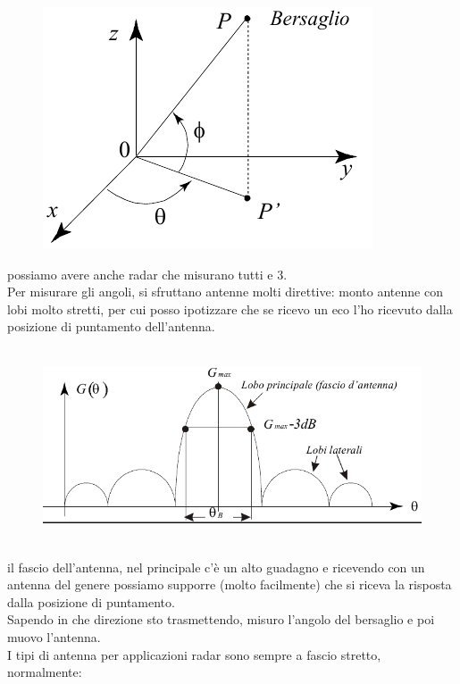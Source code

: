 \documentclass[oneside, 12pt]{extbook}
\begin{document}
\begin{figure}[!h]
	\includegraphics[scale=0.7]{immagini/localization/misure_angoli.png}
\end{figure}
possiamo avere anche radar che misurano tutti e 3.\\
Per misurare gli angoli, si sfruttano antenne molti direttive: monto antenne con lobi molto stretti, per cui posso ipotizzare che se ricevo un eco l'ho ricevuto dalla posizione di puntamento dell'antenna.\\\\
\begin{figure}[!h]
	\includegraphics[scale=0.5]{immagini/localization/lobi_antenna.png}
\end{figure}\\
il fascio dell'antenna, nel principale c'è un alto guadagno e ricevendo con un antenna del genere possiamo supporre (molto facilmente) che si riceva la risposta dalla posizione di puntamento.\\
Sapendo in che direzione sto trasmettendo, misuro l'angolo del bersaglio e poi muovo l'antenna.\\
I tipi di antenna per applicazioni radar sono sempre a fascio stretto, normalmente:\\\\
\end{document}
